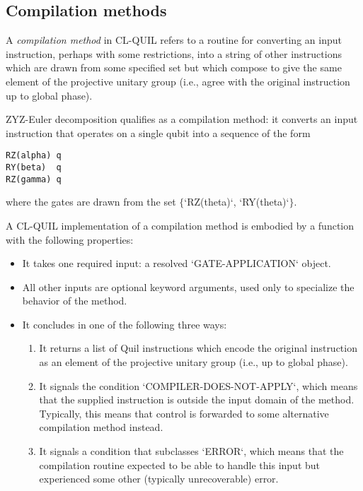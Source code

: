 \subsection{Compilation methods}\label{CompilationMethods}

A \textit{compilation method} in CL-QUIL refers to a routine for converting an input instruction, perhaps with some restrictions, into a string of other instructions which are drawn from some specified set but which compose to give the same element of the projective unitary group (i.e., agree with the original instruction up to global phase).

\begin{example}
ZYZ-Euler decomposition qualifies as a compilation method: it converts an input instruction that operates on a single qubit into a sequence of the form
\begin{verbatim}
RZ(alpha) q
RY(beta)  q
RZ(gamma) q
\end{verbatim}
where the gates are drawn from the set $\{$`RZ(theta)`, `RY(theta)`$\}$.
\end{example}

A CL-QUIL implementation of a compilation method is embodied by a function with the following properties:

\begin{itemize}
	\item It takes one required input: a resolved `GATE-APPLICATION` object.
	\item All other inputs are optional keyword arguments, used only to specialize the behavior of the method.
	\item It concludes in one of the following three ways:
	\begin{enumerate}
		\item It returns a list of Quil instructions which encode the original instruction as an element of the projective unitary group (i.e., up to global phase).
		\item It signals the condition `COMPILER-DOES-NOT-APPLY`, which means that the supplied instruction is outside the input domain of the method.  Typically, this means that control is forwarded to some alternative compilation method instead.
		\item It signals a condition that subclasses `ERROR`, which means that the compilation routine expected to be able to handle this input but experienced some other (typically unrecoverable) error.
	\end{enumerate}
\end{itemize}


